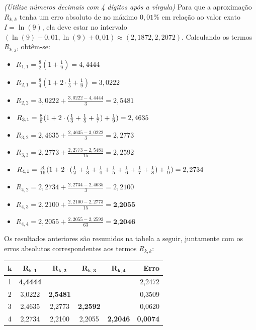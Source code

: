 \documentclass[12pt,a4paper]{article}
\begin{document}
\begin{ExerciseList}
{\color{blue} \textit{(Utilize números decimais com 4 dígitos após a vírgula)}}
\Answer Para que a aproximação $R_{k,k}$ tenha um erro absoluto de no máximo $0,01\%$ em relação ao valor exato $I = \ln(9)$, ela deve estar no intervalo $(\ln(9)-0,01, \ln(9)+0,01) \approx (2,1872, 2,2072)$. Calculando os termos $R_{k,j}$, obtêm-se:
\begin{multicols}{2}
\begin{itemize}
\item $R_{1,1}
= \frac{8}{2}(1 + \frac{1}{9})
= 4,4444$
\item $R_{2,1}
= \frac{8}{4}(1 + 2\cdot\frac{1}{5} + \frac{1}{9})
= 3,0222$
\item $R_{2,2}
= 3,0222+\frac{3,0222 - 4,4444}{3}
= 2,5481$
\item $R_{3,1}
= \frac{8}{8}(1 + 2\cdot(\frac{1}{3}+\frac{1}{5}+\frac{1}{7}) + \frac{1}{9})\\
= 2,4635$
\item $R_{3,2}
= 2,4635+\frac{2,4635-3,0222}{3}
= 2,2773$
\item $R_{3,3}
= 2,2773+\frac{2,2773-2,5481}{15}
= 2,2592$
\item $R_{4,1}
= \frac{8}{16}(1 + 2\cdot(\frac{1}{2}+\frac{1}{3}+\frac{1}{4}+\frac{1}{5}+\frac{1}{6}+\frac{1}{7}+\frac{1}{8}) + \frac{1}{9})\\
= 2,2734$
\item $R_{4,2}
= 2,2734+\frac{2,2734-2,4635}{3}
= 2,2100$
\item $R_{4,3}
= 2,2100+\frac{2,2100-2,2773}{15}
= \textbf{2,2055}$
\item $R_{4,4}
= 2,2055+\frac{2,2055-2,2592}{63}
= \textbf{2,2046}$
\end{itemize}
\end{multicols}

Os resultados anteriores são resumidos na tabela a seguir, juntamente com os erros absolutos correspondentes aos termos $R_{k,k}$:
\begin{center}
\begin{tabular}{|c|c|c|c|c|r|}
\hline 
$\mathbf{k}$ & $\mathbf{ R_{k,1} }$ & $\mathbf{ R_{k,2} }$ & $\mathbf{ R_{k,3} }$ & $\mathbf{ R_{k,4} }$ & \textbf{Erro} \\ 
\hline 
1& \textbf{4,4444} &  &  &  & 2,2472 \\ 
\hline 
2& 3,0222 & \textbf{2,5481} & & & 0,3509 \\ 
\hline 
3& 2,4635 & 2,2773 & \textbf{2,2592} & & 0,0620 \\ 
\hline 
4& 2,2734 & 2,2100 & 2,2055 & \textbf{2,2046} & \textbf{0,0074} \\ 
\hline 
\end{tabular}
\end{center}


\end{ExerciseList}
\end{document}
